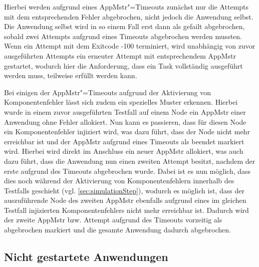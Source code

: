 Hierbei werden aufgrund eines \ac{AppMstr}"=Timeouts zunächst nur die Attempts mit dem entsprechenden Fehler abgebrochen, nicht jedoch die Anwendung selbst.
Die Anwendung selbst wird in so einem Fall erst dann als gefailt abgebrochen, sobald zwei Attempts aufgrund eines Timeouts abgebrochen werden mussten.
Wenn ein Attempt mit dem Exitcode -100 terminiert, wird unabhängig von zuvor ausgeführten Attempts ein erneuter Attempt mit entsprechendem \ac{AppMstr} gestartet, wodurch hier die Anforderung, dass ein Task vollständig ausgeführt werden muss, teilweise erfüllt werden kann.

Bei einigen der \ac{AppMstr}"=Timeouts aufgrund der Aktivierung von Komponentenfehler lässt sich zudem ein spezielles Muster erkennen.
Hierbei wurde in einem zuvor ausgeführten Testfall auf einem Node ein \ac{AppMstr} einer Anwendung ohne Fehler allokiert.
Nun kann es passieren, dass für diesen Node ein Komponentenfehler injiziert wird, was dazu führt, dass der Node nicht mehr erreichbar ist und der \ac{AppMstr} aufgrund eines Timeouts als beendet markiert wird.
Hierbei wird direkt im Anschluss ein neuer \ac{AppMstr} allokiert, was auch dazu führt, dass die Anwendung nun einen zweiten Attempt besitzt, nachdem der erste aufgrund des Timeouts abgebrochen wurde.
Dabei ist es nun möglich, dass dies noch während der Aktivierung von Komponentenfehlern innerhalb des Testfalls geschieht (vgl. \autoref{sec:simulationStep}), wodurch es möglich ist, dass der auszuführende Node des zweiten \ac{AppMstr} ebenfalls aufgrund eines im gleichen Testfall injizierten Komponentenfehlers nicht mehr erreichbar ist.
Dadurch wird der zweite \ac{AppMstr} bzw. Attempt aufgrund des Timeouts vorzeitig als abgebrochen markiert und die gesamte Anwendung dadurch abgebrochen.

\subsection{Nicht gestartete Anwendungen}
\label{sec:notStartedApps}

